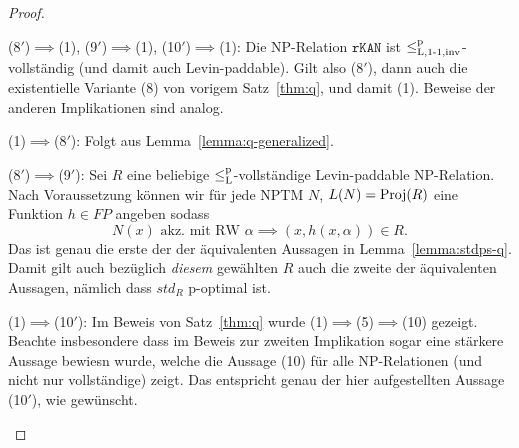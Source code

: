 \begin{proof}
\begin{prooflist}
\item (8$'$)$\implies$(1), (9$'$)$\implies$(1), (10$'$)$\implies$(1):
    Die NP-Relation $\mathtt{rKAN}$ ist $\leq_\mathrm{L,1\text{-}1,inv}^\mathrm p$-vollständig (und damit auch Levin-paddable).
    Gilt also (8$'$), dann auch die existentielle Variante (8) von vorigem Satz~\ref{thm:q}, und damit (1).
    Beweise der anderen Implikationen sind analog.

\item (1)$\implies$(8$'$): Folgt aus Lemma~\ref{lemma:q-generalized}.

\item (8$'$)$\implies$(9$'$): Sei $R$ eine beliebige $\leq_\mathrm{L}^\mathrm{p}$-vollständige Levin-paddable NP-Relation. Nach Voraussetzung können wir für jede NPTM $N$, $L(N)=\operatorname{Proj}(R)$ eine Funktion $h\in FP$ angeben sodass 
    \[ N(x) \text{ akz. mit RW $\alpha$} \implies (x,h(x,\alpha))\in R. \]
    Das ist genau die erste der der äquivalenten Aussagen in Lemma~\ref{lemma:stdps-q}. Damit gilt auch bezüglich \emph{diesem} gewählten $R$ auch die zweite der äquivalenten Aussagen, nämlich dass $\mathit{std}_R$ p-optimal ist.

\item (1)$\implies$(10$'$): Im Beweis von Satz~\ref{thm:q} wurde (1)$\implies$(5)$\implies$(10) gezeigt. Beachte insbesondere dass im Beweis zur zweiten Implikation sogar eine stärkere Aussage bewiesn wurde, welche die Aussage (10) für alle NP-Relationen (und nicht nur vollständige) zeigt. Das entspricht genau der hier aufgestellten Aussage (10$'$), wie gewünscht.

\end{prooflist}
\end{proof}

